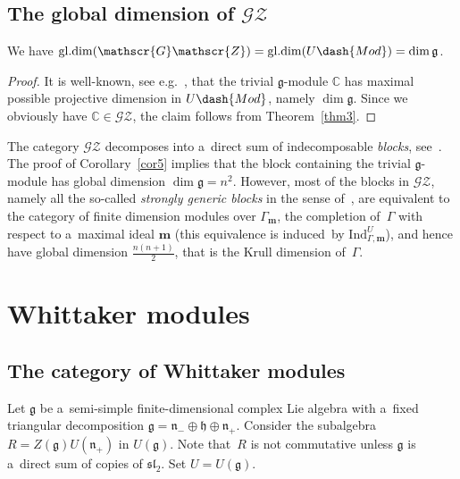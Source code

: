 \documentclass[pdftex]{sigma}
\begin{document}
\subsection[The global dimension of $\mathscr{G}\mathscr{Z}$]{The global dimension of $\boldsymbol{\mathscr{G}\mathscr{Z}}$}%

\begin{corollary}
\label{cor5}
We have $\mathrm{gl.dim}(\mathscr{G}\mathscr{Z})=\mathrm{gl.dim}(U\dash{Mod})=\dim\mathfrak{g}$.
\end{corollary}

\begin{proof}
It is well-known, see e.g.~\cite[Corollary~7.7.3]{We}, that the trivial $\mathfrak{g}$-module $\mathbb{C}$ has maximal
possible projective dimension in $U\dash{Mod}$, namely $\dim\mathfrak{g}$.
Since we obviously have $\mathbb{C}\in \mathscr{G}\mathscr{Z}$, the claim follows from Theorem~\ref{thm3}.
\end{proof}

\begin{remark}
The category $\mathscr{G}\mathscr{Z}$ decomposes into a~direct sum of indecomposable {\em blocks},
see~\cite[Theorem~24]{DFO}.
The proof of Corollary~\ref{cor5} implies that the block containing the trivial $\mathfrak{g}$-module has global
dimension $\dim\mathfrak{g}=n^2$.
However, most of the blocks in $\mathscr{G}\mathscr{Z}$, namely all the so-called {\em strongly generic blocks} in the
sense of~\cite[Section~3]{MaOv}, are equivalent to the category of f\/inite dimension modules over $\Gamma_{\mathbf{m}}$,
the completion of~$\Gamma$ with respect to a~maximal ideal $\mathbf{m}$ (this equivalence is induced~by
$\mathrm{Ind}_{\Gamma,\mathbf{m}}^U$), and hence have global dimension $\frac{n(n+1)}{2}$, that is the Krull dimension
of~$\Gamma$.
\end{remark}

\section{Whittaker modules}\label{s3}

\subsection{The category of Whittaker modules}%

Let $\mathfrak{g}$ be a~semi-simple f\/inite-dimensional complex Lie algebra with a~f\/ixed triangular decomposition
$\mathfrak{g}=\mathfrak{n}_-\oplus\mathfrak{h}\oplus\mathfrak{n}_+$.
Consider the subalgebra $R=Z(\mathfrak{g})U(\mathfrak{n}_+)$ in $U(\mathfrak{g})$.
Note that~$R$ is not commutative unless $\mathfrak{g}$ is a~direct sum of copies of $\mathfrak{sl}_2$.
Set $U=U(\mathfrak{g})$.
\end{document}
